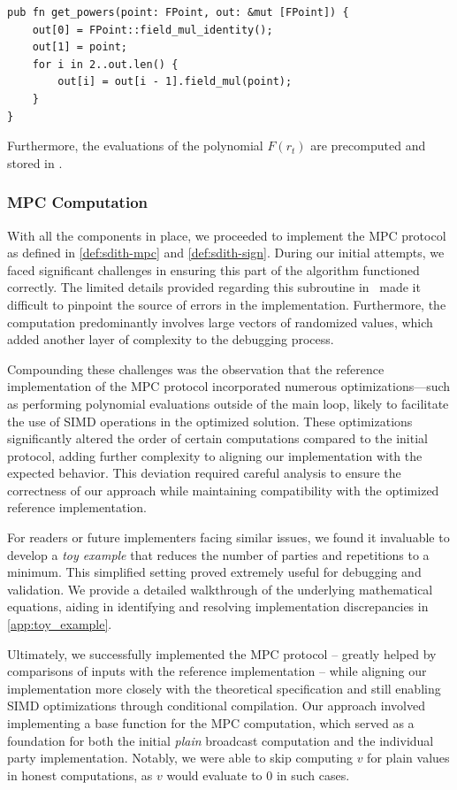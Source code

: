 \documentclass[11pt]{report}
\theoremstyle{definition}
\theoremstyle{plain}
\begin{document}
\begin{verbatim}
pub fn get_powers(point: FPoint, out: &mut [FPoint]) {
    out[0] = FPoint::field_mul_identity();
    out[1] = point;
    for i in 2..out.len() {
        out[i] = out[i - 1].field_mul(point);
    }
}
\end{verbatim}

Furthermore, the evaluations of the polynomial $F(r_t)$ are precomputed and stored in .

\subsubsection{MPC Computation}

With all the components in place, we proceeded to implement the MPC protocol as defined in \autoref{def:sdith-mpc} and \autoref{def:sdith-sign}. During our initial attempts, we faced significant challenges in ensuring this part of the algorithm functioned correctly. The limited details provided regarding this subroutine in~\cite{aguilarsyndrome11} made it difficult to pinpoint the source of errors in the implementation. Furthermore, the computation predominantly involves large vectors of randomized values, which added another layer of complexity to the debugging process.

Compounding these challenges was the observation that the reference implementation of the MPC protocol incorporated numerous optimizations—such as performing polynomial evaluations outside of the main loop, likely to facilitate the use of SIMD operations in the optimized solution. These optimizations significantly altered the order of certain computations compared to the initial protocol, adding further complexity to aligning our implementation with the expected behavior. This deviation required careful analysis to ensure the correctness of our approach while maintaining compatibility with the optimized reference implementation.

For readers or future implementers facing similar issues, we found it invaluable to develop a \textit{toy example} that reduces the number of parties and repetitions to a minimum. This simplified setting proved extremely useful for debugging and validation. We provide a detailed walkthrough of the underlying mathematical equations, aiding in identifying and resolving implementation discrepancies in \autoref{app:toy_example}.

Ultimately, we successfully implemented the MPC protocol -- greatly helped by comparisons of inputs with the reference implementation -- while aligning our implementation more closely with the theoretical specification and still enabling SIMD optimizations through conditional compilation. Our approach involved implementing a base function for the MPC computation, which served as a foundation for both the initial \textit{plain} broadcast computation and the individual party implementation. Notably, we were able to skip computing $v$ for plain values in honest computations, as $v$ would evaluate to $0$ in such cases.
\end{document}

